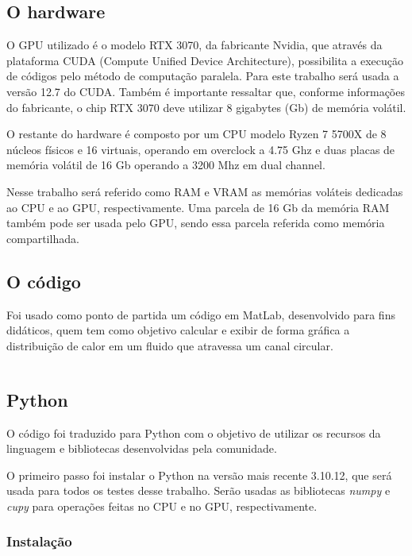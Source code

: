 \documentclass[12pt,a4paper]{article}
\begin{document}
\subsection{O hardware}

O GPU utilizado é o modelo RTX 3070, da fabricante Nvidia, que através da plataforma CUDA (Compute Unified Device Architecture), possibilita a execução de códigos pelo método de computação paralela. Para este trabalho será usada a versão 12.7 do CUDA. Também é importante ressaltar que, conforme informações do fabricante, o chip RTX 3070 deve utilizar 8 gigabytes (Gb) de memória volátil.

O restante do hardware é composto por um CPU modelo Ryzen 7 5700X de 8 núcleos físicos e 16 virtuais, operando em overclock a 4.75 Ghz e duas placas de memória volátil de 16 Gb operando a 3200 Mhz em dual channel.

Nesse trabalho será referido como RAM e VRAM as memórias voláteis dedicadas ao CPU e ao GPU, respectivamente. Uma parcela de 16 Gb da memória RAM também pode ser usada pelo GPU, sendo essa parcela referida como memória compartilhada.

\subsection{O código}

Foi usado como ponto de partida um código em MatLab, desenvolvido para fins didáticos, quem tem como objetivo calcular e exibir de forma gráfica a distribuição de calor em um fluido que atravessa um canal circular.

\inputminted{octave}{cfd_on_gpu/aula15_exercicio_VolumesFinitos_Poiseuille_Flow_2D.m}

\subsection{Python}

O código foi traduzido para Python com o objetivo de utilizar os recursos da linguagem e bibliotecas desenvolvidas pela comunidade.

O primeiro passo foi instalar o Python na versão mais recente 3.10.12, que será usada para todos os testes desse trabalho. Serão usadas as bibliotecas \emph{numpy} e \emph{cupy} para operações feitas no CPU e no GPU, respectivamente.

\subsubsection{Instalação}
\end{document}
